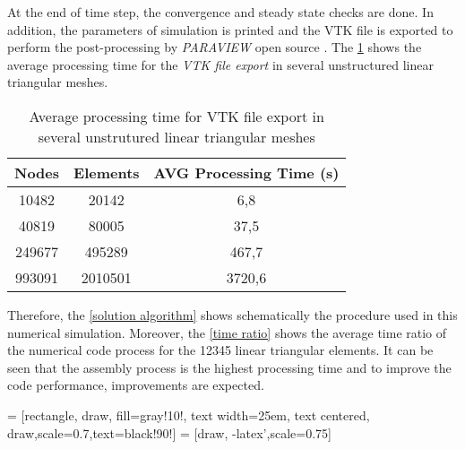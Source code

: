 \medskip
At the end of time step, the convergence and steady state checks are done.
In addition, the parameters of simulation is printed and
the VTK file is exported to perform the post-processing by
\textit{PARAVIEW} open source \cite{paraview}. 
The \ref{tempo export vtk} 
shows the average processing time for the \textit{VTK file export}
in several unstructured linear triangular meshes.

\vspace{0.5cm}
\begin{table}[H]
\centering
\begin{tabular}{ccc}
\toprule
\textbf{Nodes} & \textbf{Elements} & \textbf{AVG Processing Time} (s) \\
\midrule
10482 & 20142 & 6,8 \\
40819 & 80005 & 37,5 \\
249677 & 495289 & 467,7 \\
993091 & 2010501 & 3720,6 \\
\bottomrule
\end{tabular}
\caption{Average processing time for VTK file export in several unstrutured linear triangular meshes}
\label{tempo export vtk}
\end{table}

\medskip
Therefore, the \ref{solution algorithm} shows schematically the procedure used
in this numerical simulation.
Moreover, the \ref{time ratio} shows the average time ratio
of the numerical code process for the 12345 linear triangular elements. 
It can be seen that 
the assembly process is the highest processing time
and to improve the code performance, improvements are expected.



\vspace{0.5cm}
 = [rectangle, draw, fill=gray!10!,
    text width=25em, text centered, draw,scale=0.7,text=black!90!]
 = [draw, -latex',scale=0.75]



